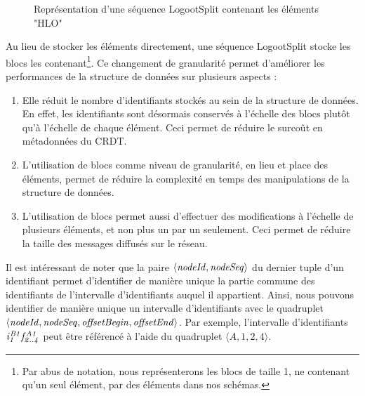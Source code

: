 \begin{figure}[!ht]
  \centering
  \hfil
  \caption{Représentation d'une séquence LogootSplit contenant les éléments "HLO"}
  \label{fig:logootsplit-seq}
\end{figure}

Au lieu de stocker les éléments directement, une séquence LogootSplit stocke les blocs les contenant\footnote{Par abus de notation, nous représenterons les blocs de taille 1, \ie ne contenant qu'un seul élément, par des éléments dans nos schémas.}.
Ce changement de granularité permet d'améliorer les performances de la structure de données sur plusieurs aspects :
\begin{enumerate}
  \item Elle réduit le nombre d'identifiants stockés au sein de la structure de données.
    En effet, les identifiants sont désormais conservés à l'échelle des blocs plutôt qu'à l'échelle de chaque élément.
    Ceci permet de réduire le surcoût en métadonnées du \ac{CRDT}.
  \item L'utilisation de blocs comme niveau de granularité, en lieu et place des éléments, permet de réduire la complexité en temps des manipulations de la structure de données.
  \item L'utilisation de blocs permet aussi d'effectuer des modifications à l'échelle de plusieurs éléments, et non plus un par un seulement.
    Ceci permet de réduire la taille des messages diffusés sur le réseau.
\end{enumerate}

Il est intéressant de noter que la paire $\langle \mathit{nodeId},\mathit{nodeSeq} \rangle$ du dernier tuple d'un identifiant permet d'identifier de manière unique la partie commune des identifiants de l'intervalle d'identifiants auquel il appartient.
Ainsi, nous pouvons identifier de manière unique un intervalle d'identifiants avec le quadruplet $\langle \mathit{nodeId}, \mathit{nodeSeq}, \mathit{offsetBegin}, \mathit{offsetEnd} \rangle$.
Par exemple, l'intervalle d'identifiants $\mathit{i}^{\mathit{B1}}_{\mathit{1}}\mathit{f}^{\mathit{A1}}_{\mathit{2..4}}$ peut être référencé à l'aide du quadruplet $\langle A,1,2,4 \rangle$.
